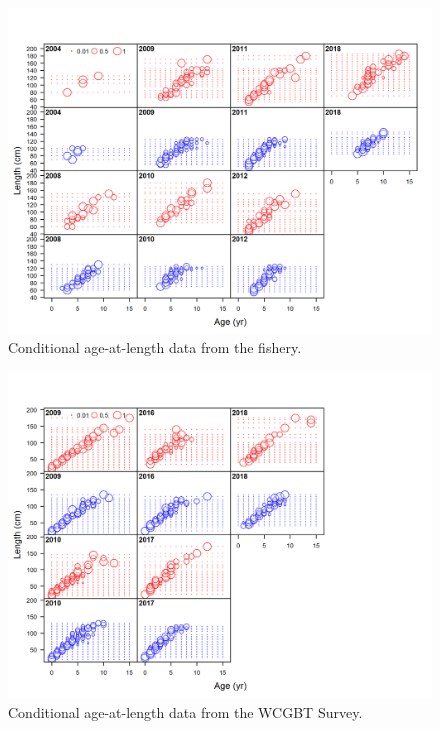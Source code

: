 \documentclass[12pt,]{article}
\begin{document}
\begin{figure}
\centering
\includegraphics{r4ss/plots_mod1/comp_condAALdat_bubflt1mkt2.png}
\caption{Conditional age-at-length data from the fishery.
\label{fig:age_dat_fishery}}
\end{figure}

\begin{figure}
\centering
\includegraphics{r4ss/plots_mod1/comp_condAALdat_bubflt5mkt0.png}
\caption{Conditional age-at-length data from the WCGBT Survey.
\label{fig:age_dat_fishery}}
\end{figure}
\end{document}
